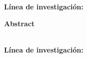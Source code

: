 \textbf{\small \textit{\lipsum[0-1][10]}}


\textbf{\small L\'inea de investigaci\'on:} \small \lipsum[0-1][10]



\newpage
\textbf{\LARGE Abstract}\\\\
\lipsum[0-1]

\textbf{\small \textit{\lipsum[0-1][10]}}


\textbf{\small L\'inea de investigaci\'on:} \small \lipsum[0-1][10]

